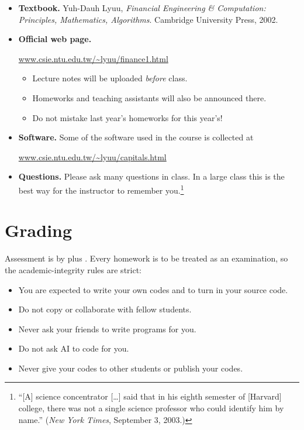 \begin{itemize}[itemsep=0.35em]
	\item \textbf{Textbook.} Yuh-Dauh Lyuu, \emph{Financial Engineering \& Computation: Principles, Mathematics, Algorithms}.
	      Cambridge University Press, 2002.

	\item \textbf{Official web page.}
	      \begin{center}
		      \url{www.csie.ntu.edu.tw/~lyuu/finance1.html}
	      \end{center}
	      \begin{itemize}[nosep]
		      \item Lecture notes will be uploaded \emph{before} class.
		      \item Homeworks and teaching assistants will also be announced there.
		      \item Do not mistake last year's homeworks for this year's!
	      \end{itemize}

	\item \textbf{Software.} Some of the software used in the course is collected at
	      \begin{center}
		      \url{www.csie.ntu.edu.tw/~lyuu/capitals.html}
	      \end{center}

	\item \textbf{Questions.} Please ask many questions in class.
	      In a large class this is the best way for the instructor to remember you.\footnote{``[A] science concentrator [\ldots] said that in his eighth semester of [Harvard] college, there was not a single science professor who could identify him by name.'' (\emph{New York Times}, September 3, 2003.)}
\end{itemize}

\section{Grading}


Assessment is by  plus .
Every homework is to be treated as an examination, so the academic-integrity rules are strict:

\begin{itemize}[nosep]
	\item You are expected to write your own codes and to turn in your source code.
	\item Do not copy or collaborate with fellow students.
	\item Never ask your friends to write programs for you.
	\item Do not ask AI to code for you.
	\item Never give your codes to other students or publish your codes.
\end{itemize}

